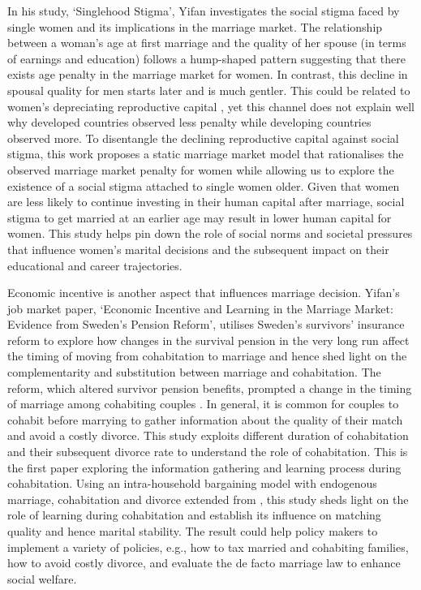 \documentclass[12pt, letterpaper]{article}
\begin{document}
In his study, `Singlehood Stigma', Yifan investigates the social stigma faced by single women and its implications in the marriage market. The relationship between a woman's age at first marriage and the quality of her spouse (in terms of earnings and education) follows a hump-shaped pattern suggesting that there exists age penalty in the marriage market for women. In contrast, this decline in spousal quality for men starts later and is much gentler. This could be related to women’s depreciating reproductive capital \citep{Low2023}, yet this channel does not explain well why developed countries observed less penalty while developing countries observed more. To disentangle the declining reproductive capital against social stigma, this work proposes a static marriage market model that rationalises the observed marriage market penalty for women while allowing us to explore the existence of a social stigma attached to single women older. Given that women are less likely to continue investing in their human capital after marriage, social stigma to get married at an earlier age may result in lower human capital for women. This study helps pin down the role of social norms and societal pressures that influence women's marital decisions and the subsequent impact on their educational and career trajectories. 


Economic incentive is another aspect that influences marriage decision. Yifan's job market paper, `Economic Incentive and Learning in the Marriage Market: Evidence from Sweden’s Pension Reform', utilises Sweden's survivors' insurance reform to explore how changes in the survival pension in the very long run affect the timing of moving from cohabitation to marriage and hence shed light on the complementarity and substitution between marriage and cohabitation. The reform, which altered survivor pension benefits, prompted a change in the timing of marriage among cohabiting couples \citep{Persson2020}. In general, it is common for couples to cohabit before marrying to gather information about the quality of their match and avoid a costly divorce.  This study exploits different duration of cohabitation and their subsequent divorce rate to understand the role of cohabitation. This is the first paper exploring the information gathering and learning process during cohabitation. Using an intra-household bargaining model with endogenous marriage, cohabitation and divorce extended from \cite{Voena2015}, this study sheds light on the role of learning during cohabitation and establish its influence on matching quality and hence marital stability. The result could help policy makers to implement a variety of policies, e.g., how to tax married and cohabiting families, how to avoid costly divorce, and evaluate the de facto marriage law to enhance social welfare.
\end{document}

